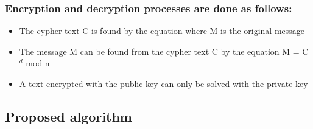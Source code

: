 \subsubsection{Encryption and decryption processes are done as follows:}
\vspace{-18pt}
\begin{itemize}
	\item The cypher text C is found by the equation where M is the original
	      message
	\item The message M can be found from the cypher text C by the equation M = C$^d$ mod n
	\item A text encrypted with the public key can only be solved with the private key
\end{itemize}
\pagebreak
\subsection{Proposed algorithm}
